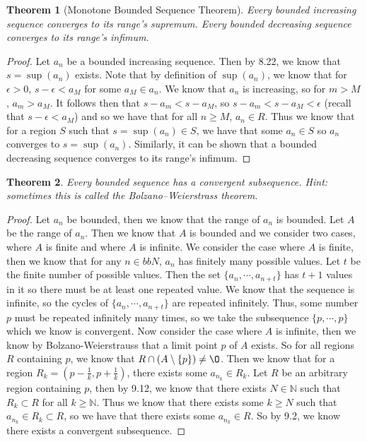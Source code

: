 \documentclass[12pt]{article}
\newcommand{\bbN}{\mathbb{N}}
\renewcommand{\emptyset}{\O}
\renewcommand{\_}[1]{\underline{ #1 }}
\newtheorem{theorem}{Theorem}[section]
\theoremstyle{definition}
\numberwithin{equation}{subsection}
\begin{document}
\begin{theorem}[Monotone Bounded Sequence Theorem]
Every bounded increasing sequence converges to its range's supremum.
Every bounded decreasing sequence converges to its range's infimum.
\end{theorem}

\begin{proof}
Let $a_n$ be a bounded increasing sequence. Then by 8.22, we know that $s = \sup(a_n)$ exists. Note that by definition of $\sup(a_n)$, we know that for $\epsilon > 0$, $s - \epsilon < a_M$ for some $a_M \in a_n$. We know that $a_n$ is increasing, so for $m > M$, $a_m > a_M$. It follows then that $s - a_m < s - a_M$, so $s - a_m < s - a_M < \epsilon$ (recall that $s - \epsilon < a_M$) and so we have that for all $n \geq M$, $a_n \in R$. Thus we know that for a region $S$ such that $s = \sup(a_n) \in S$, we have that some $a_n \in S$ so $a_n$ converges to $s = \sup(a_n)$. Similarly, it can be shown that a bounded decreasing sequence converges to its range's infimum.
\end{proof}

\begin{theorem}  Every bounded sequence has a convergent subsequence. 
\emph{Hint: sometimes this is called the Bolzano--Weierstrass theorem.} 
\end{theorem}

\begin{proof}
Let $a_n$ be bounded, then we know that the range of $a_n$ is bounded. Let $A$ be the range of $a_n$. Then we know that $A$ is bounded and we consider two cases, where $A$ is finite and where $A$ is infinite. \newline
We consider the case where $A$ is finite, then we know that for any $n \in bbN$, $a_n$ has finitely many possible values. Let $t$ be the finite number of possible values. Then the set $\{a_n, \dotsm, a_{n+t}\}$ has $t + 1$ values in it so there must be at least one repeated value. We know that the sequence is infinite, so the cycles of $\{a_n, \dotsm, a_{n+t}\}$ are repeated infinitely. Thus, some number $p$ must be repeated infinitely many times, so we take the subsequence $\{p, \dotsm, p\}$ which we know is convergent. \newline
Now consider the case where $A$ is infinite, then we know by Bolzano-Weierstrauss that a limit point $p$ of $A$ exists. So for all regions $R$ containing $p$, we know that $R \cap (A \setminus \{p\}) \not = \emptyset$. Then we know that for a region $R_k = (p - \frac{1}{k}, p + \frac{1}{k})$, there exists some $a_{n_k} \in R_k$. Let $R$ be an arbitrary region containing $p$, then by 9.12, we know that there exists $N \in \bbN$ such  that $R_k \subset R$ for all $k \geq \bbN$. Thus we know  that there exists some $k \geq N$ such that $a_{n_k} \in R_k \subset R$, so we have that there exists some $a_{n_k} \in R$. So by 9.2, we know there exists a convergent subsequence.
\end{proof}
\end{document}
